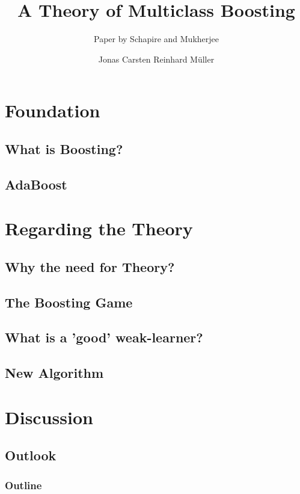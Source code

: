 \documentclass{beamer}
\author[Jonas Müller]{Jonas Carsten Reinhard Müller}
\begin{document}
\title[Boosting]{A Theory of Multiclass Boosting}
\subtitle[short subtitle]{Paper by Schapire and Mukherjee \cite{mukherjee2011theory}}
\institute{}
\date{}

\begin{frame}
    \titlepage
\end{frame}


\section{Foundation}
\subsection{What is Boosting?}
\subsection{AdaBoost}
\section{Regarding the Theory}
\subsection{Why the need for Theory?}
\subsection{The Boosting Game}
\subsection{What is a 'good' weak-learner?}
\subsection{New Algorithm}
\section{Discussion}
\subsection{Outlook}


\begin{frame}
    \frametitle{Outline}
    \tableofcontents
\end{frame}


\end{document}
